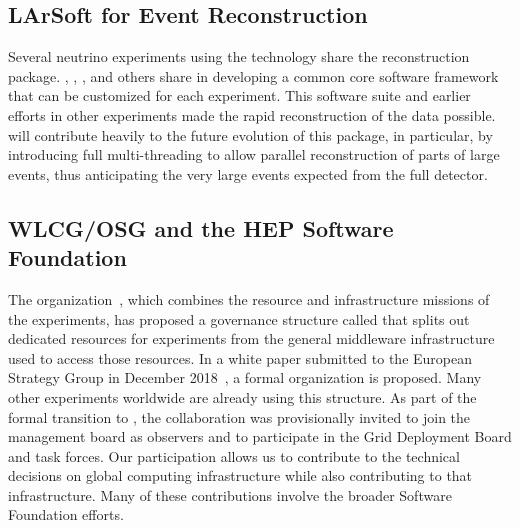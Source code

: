 \subsection{LArSoft for Event Reconstruction}

Several neutrino experiments using the  technology share the \cite{Snider:2017wjd} reconstruction package.  , , , and others share in developing a common core software framework that can be customized for each experiment. This software suite and earlier efforts in other experiments made the rapid reconstruction of the  data possible.   will contribute heavily to  the future evolution of this package, in particular, by introducing full multi-threading to allow parallel reconstruction of parts of large events, thus anticipating the very large events expected from the full detector. 

\subsection{WLCG/OSG and the HEP Software Foundation}

The   organization~\cite{Bird:2014ctt}, which combines the resource and infrastructure missions of the  experiments, has proposed a governance structure called  that splits out dedicated resources for  experiments from the general middleware infrastructure used to access those resources.  In a white paper submitted to the European Strategy Group in December 2018~\cite{bib:BirdEUStrategy}, a formal  organization is proposed. Many other experiments worldwide are already using this structure.  As part of the formal transition to , the  collaboration was provisionally invited to join the  management board as observers and to participate in the Grid Deployment Board and task forces. Our participation allows us to contribute to the  technical decisions on global computing infrastructure while also contributing to that infrastructure. Many of these contributions involve the broader  Software Foundation efforts. 

